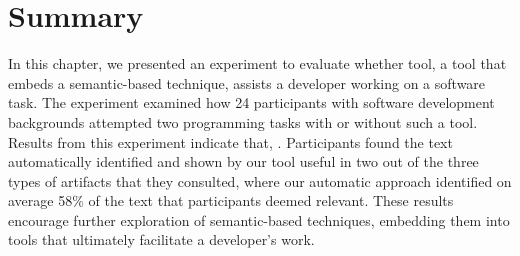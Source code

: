 \section{Summary}
\label{cp6:summary}



In this chapter, we presented an experiment to evaluate whether \acs{tool},
 a tool that embeds a semantic-based technique, assists a developer working on a software task. 
The experiment examined how 24 participants with software development backgrounds attempted 
two programming tasks with or without such a tool. 
Results from this experiment indicate that, 
.
Participants  found the text automatically identified and shown by our tool useful in two 
out of the three types of artifacts that they consulted, where our automatic approach identified on average 58\% of the text that participants deemed relevant. 
These results encourage further exploration of semantic-based techniques, 
embedding them into tools that ultimately facilitate a developer's work.